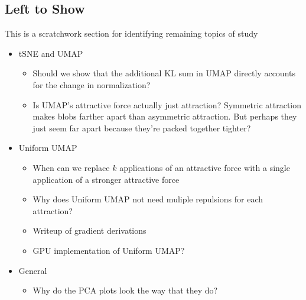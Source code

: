 \documentclass{article}
\theoremstyle{definition}
\begin{document}
\begin{multicols}{2}
\section{Left to Show}
This is a scratchwork section for identifying remaining topics of study
\begin{itemize}
    \item tSNE and UMAP
        \begin{itemize}
            \item Should we show that the additional KL sum in UMAP directly accounts for the change in normalization?
            \item Is UMAP's attractive force actually just attraction? Symmetric attraction makes blobs farther apart than asymmetric attraction. But perhaps
                they just seem far apart because they're packed together tighter?
        \end{itemize}
    \item Uniform UMAP
        \begin{itemize}
            \item When can we replace $k$ applications of an attractive force with a single application of a stronger attractive force
            \item Why does Uniform UMAP not need muliple repulsions for each attraction?
            \item Writeup of gradient derivations
            \item GPU implementation of Uniform UMAP?
        \end{itemize}
    \item General
        \begin{itemize}
            \item Why do the PCA plots look the way that they do?
        \end{itemize}
\end{itemize}

\end{multicols}
\printbibliography
\end{document}
